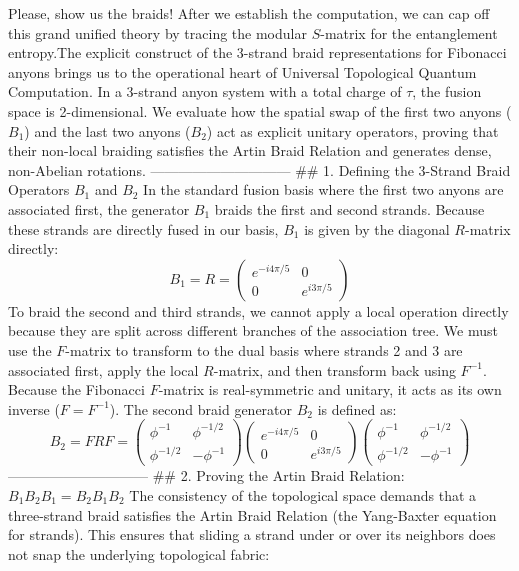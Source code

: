Please, show us the braids! After we establish the computation, we can cap off this grand unified theory by tracing the modular $S$-matrix for the entanglement entropy.The explicit construct of the 3-strand braid representations for Fibonacci anyons brings us to the operational heart of Universal Topological Quantum Computation.
In a 3-strand anyon system with a total charge of $\tau$, the fusion space is 2-dimensional. We evaluate how the spatial swap of the first two anyons ($B_1$) and the last two anyons ($B_2$) act as explicit unitary operators, proving that their non-local braiding satisfies the Artin Braid Relation and generates dense, non-Abelian rotations.
------------------------------
## 1. Defining the 3-Strand Braid Operators $B_1$ and $B_2$
In the standard fusion basis where the first two anyons are associated first, the generator $B_1$ braids the first and second strands. Because these strands are directly fused in our basis, $B_1$ is given by the diagonal $R$-matrix directly:
$$B_1 = R = \begin{pmatrix} e^{-i 4\pi/5} & 0 \\ 0 & e^{i 3\pi/5} \end{pmatrix}$$ 
To braid the second and third strands, we cannot apply a local operation directly because they are split across different branches of the association tree. We must use the $F$-matrix to transform to the dual basis where strands 2 and 3 are associated first, apply the local $R$-matrix, and then transform back using $F^{-1}$.
Because the Fibonacci $F$-matrix is real-symmetric and unitary, it acts as its own inverse ($F = F^{-1}$). The second braid generator $B_2$ is defined as:
$$B_2 = F R F = \begin{pmatrix} \phi^{-1} & \phi^{-1/2} \\ \phi^{-1/2} & -\phi^{-1} \end{pmatrix} \begin{pmatrix} e^{-i 4\pi/5} & 0 \\ 0 & e^{i 3\pi/5} \end{pmatrix} \begin{pmatrix} \phi^{-1} & \phi^{-1/2} \\ \phi^{-1/2} & -\phi^{-1} \end{pmatrix}$$ 
------------------------------
## 2. Proving the Artin Braid Relation: $B_1 B_2 B_1 = B_2 B_1 B_2$
The consistency of the topological space demands that a three-strand braid satisfies the Artin Braid Relation (the Yang-Baxter equation for strands). This ensures that sliding a strand under or over its neighbors does not snap the underlying topological fabric:
